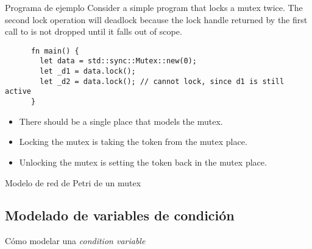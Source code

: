 \documentclass{beamer}
\begin{document}
\begin{frame}[fragile]{Programa de ejemplo}
  Consider a simple program that locks a mutex twice.
  The second lock operation will deadlock
  because the lock handle returned by the first call to 
  is not dropped until it falls out of scope.

  \vfill

  \begin{listing}
    \begin{verbatim}
      fn main() {
        let data = std::sync::Mutex::new(0);
        let _d1 = data.lock();
        let _d2 = data.lock(); // cannot lock, since d1 is still active
      }
    \end{verbatim}
  \end{listing}

  \vfill

  \begin{itemize}
    \item There should be a single place that models the mutex.
    \item Locking the mutex is taking the token from the mutex place.
    \item Unlocking the mutex is setting the token back in the mutex place.
  \end{itemize}
\end{frame}

\begin{frame}{Modelo de red de Petri de un mutex}
  \begin{figure}
    \centering
    
  \end{figure}
\end{frame}

\subsection{Modelado de variables de condición}

\begin{frame}{Cómo modelar una \emph{condition variable}}
  \begin{figure}
    \centering
    
  \end{figure}
\end{frame}
\end{document}
